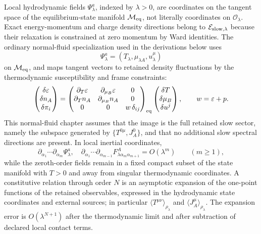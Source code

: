 \begin{definition}
Local hydrodynamic fields \(\Psi^a_\lambda\), indexed by \(\lambda>0\), are
coordinates on the tangent space of the equilibrium-state manifold
\(\mathcal M_{\rm eq}\), not literally coordinates on
\(\mathcal O_\lambda\).  Exact energy-momentum and charge density directions
belong to \(\mathcal E_{\rm slow,\lambda}\) because their relaxation is
constrained at zero momentum by Ward identities.  The ordinary normal-fluid
specialization used in the derivations below uses
\[
  \Psi^a_\lambda=(T_\lambda,\mu_{\lambda A},u^\mu_\lambda)
\]
on \(\mathcal M_{\rm eq}\), and maps tangent vectors to retained density
fluctuations by the thermodynamic susceptibility and frame constraints:
\[
  \begin{pmatrix}
    \delta\varepsilon\\
    \delta n_A\\
    \delta\pi_i
  \end{pmatrix}
  =
  \begin{pmatrix}
    \partial_T\varepsilon & \partial_{\mu_B}\varepsilon & 0\\
    \partial_T n_A & \partial_{\mu_B}n_A & 0\\
    0 & 0 & w\,\delta_{ij}
  \end{pmatrix}_{\rm eq}
  \begin{pmatrix}
    \delta T\\
    \delta\mu_B\\
    \delta u^j
  \end{pmatrix},
  \qquad
  w=\varepsilon+p .
\]
This normal-fluid chapter assumes that the image is the full retained slow
sector, namely the subspace generated by \(\{T^{0\mu},J_A^0\}\), and that no
additional slow spectral directions are present.  In local inertial
coordinates,
\[
  \partial_{\alpha_1}\cdots\partial_{\alpha_m}
  \Psi^a_\lambda,\quad
  \partial_{\alpha_1}\cdots\partial_{\alpha_{m-1}}
  F^A_{\lambda\alpha_m\alpha_{m+1}}
  =
  O(\lambda^m)
  \qquad(m\ge1),
\]
while the zeroth-order fields remain in a fixed compact subset of the
state manifold with \(T>0\) and away from singular thermodynamic
coordinates.  A constitutive relation through order \(N\) is an asymptotic
expansion of the one-point functions of the retained observables, expressed
in the hydrodynamic state coordinates and external sources; in particular
\(\langle T^{\mu\nu}\rangle_{\rho_\lambda}\) and
\(\langle J_A^\mu\rangle_{\rho_\lambda}\).  The expansion error is
\(O(\lambda^{N+1})\) after the thermodynamic limit and after subtraction of
declared local contact terms.
\end{definition}

